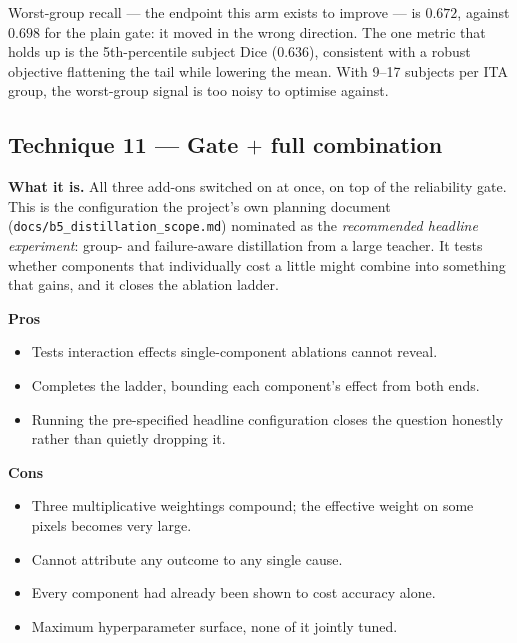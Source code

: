\documentclass[11pt]{article}
\newcommand{\pro}[1]{\item[\textcolor{proscol}{$+$}] #1}
\newcommand{\con}[1]{\item[\textcolor{conscol}{$-$}] #1}
\begin{document}
Worst-group recall --- the endpoint this arm exists to improve --- is $0.672$, against $0.698$ for
the plain gate: it moved in the wrong direction. The one metric that holds up is the 5th-percentile
subject Dice ($0.636$), consistent with a robust objective flattening the tail while lowering the
mean. With 9--17 subjects per ITA group, the worst-group signal is too noisy to optimise against.

\subsection{Technique 11 --- Gate $+$ full combination}

\textbf{What it is.} All three add-ons switched on at once, on top of the reliability gate. This is
the configuration the project's own planning document (\texttt{docs/b5\_distillation\_scope.md})
nominated as the \emph{recommended headline experiment}: group- and failure-aware distillation from
a large teacher. It tests whether components that individually cost a little might combine into
something that gains, and it closes the ablation ladder.

\begin{minipage}[t]{0.475\textwidth}
\textbf{\textcolor{proscol}{Pros}}
\begin{itemize}[leftmargin=1.5em,itemsep=1pt,label={},labelwidth=1em,labelsep=0.4em,align=left]
  \pro{Tests interaction effects single-component ablations cannot reveal.}
  \pro{Completes the ladder, bounding each component's effect from both ends.}
  \pro{Running the pre-specified headline configuration closes the question honestly rather than
       quietly dropping it.}
\end{itemize}
\end{minipage}\hfill%
\begin{minipage}[t]{0.475\textwidth}
\textbf{\textcolor{conscol}{Cons}}
\begin{itemize}[leftmargin=1.5em,itemsep=1pt,label={},labelwidth=1em,labelsep=0.4em,align=left]
  \con{Three multiplicative weightings compound; the effective weight on some pixels becomes very
       large.}
  \con{Cannot attribute any outcome to any single cause.}
  \con{Every component had already been shown to cost accuracy alone.}
  \con{Maximum hyperparameter surface, none of it jointly tuned.}
\end{itemize}
\end{minipage}
\end{document}
